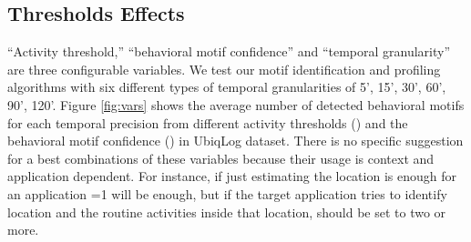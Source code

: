 \documentclass{sig-alternate}
\begin{document}
\subsection{Thresholds Effects} \label{teffect}
``Activity threshold,'' ``behavioral motif confidence'' and ``temporal granularity'' are three configurable variables. We test our motif identification and profiling algorithms with six different types of temporal granularities of 5', 15', 30', 60', 90', 120'. Figure \ref{fig:vars} shows the average number of detected behavioral motifs for each temporal precision from different activity thresholds () and the behavioral motif confidence () in UbiqLog dataset. There is no specific suggestion for a best combinations of these variables because their usage is context and application dependent. For instance, if just estimating the location is enough for an application =1 will be enough, but if the target application tries to identify location and the routine activities inside that location,  should be set to two or more. \\
\begin{figure*}[ht]
\begin{floatrow}
\CenterFloatBoxes
{}
\end{floatrow}
\vspace{-0.2cm}
\end{figure*}
\end{document}

